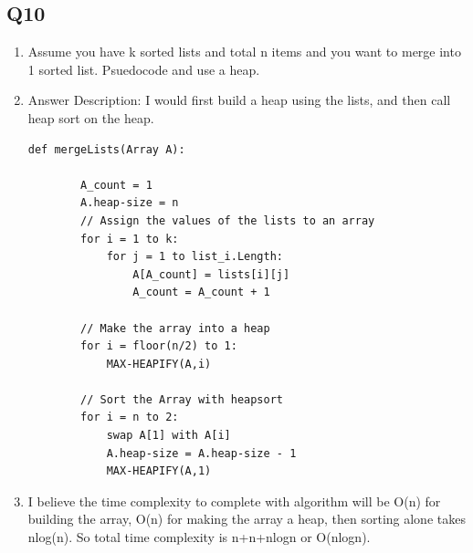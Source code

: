 \documentclass{article}
\begin{document}
\subsection*{Q10}
\begin{enumerate}[label=(\alph*)]
    \item Assume you have k sorted lists and total n items and you want to merge into 1 sorted list. Psuedocode and use a heap.
    \item Answer Description: I would first build a heap using the lists, and then call heap sort on the heap.
    \begin{lstlisting}[frame=single]
    def mergeLists(Array A):
        
        A_count = 1
        A.heap-size = n
        // Assign the values of the lists to an array
        for i = 1 to k:
            for j = 1 to list_i.Length:
                A[A_count] = lists[i][j]
                A_count = A_count + 1
    
        // Make the array into a heap
        for i = floor(n/2) to 1:
            MAX-HEAPIFY(A,i)
        
        // Sort the Array with heapsort
        for i = n to 2:
            swap A[1] with A[i]
            A.heap-size = A.heap-size - 1
            MAX-HEAPIFY(A,1)

    \end{lstlisting}
    \item I believe the time complexity to complete with algorithm will be O(n) for building the array, O(n) for making the array a heap, then sorting alone takes nlog(n). So total time complexity is n+n+nlogn or O(nlogn).


\end{enumerate}

\end{document}
